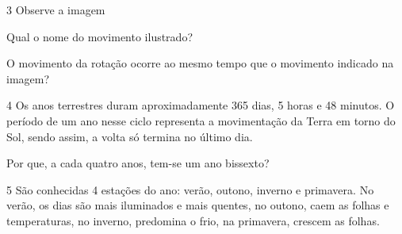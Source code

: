\num{3} Observe a imagem



\begin{escolha}
\item Qual o nome do movimento ilustrado?


\item O movimento da rotação ocorre ao mesmo tempo que o movimento indicado na imagem?

\end{escolha}

\num{4} Os anos terrestres duram aproximadamente 365 dias, 5 horas
e 48 minutos. O período de um ano nesse ciclo representa a movimentação
da Terra em torno do Sol, sendo assim, a volta só termina no último dia.

Por que, a cada quatro anos, tem-se um ano bissexto?


\num{5} São conhecidas 4 estações do ano: verão, outono, inverno e
primavera. No verão, os dias são mais iluminados e mais quentes, no
outono, caem as folhas e temperaturas, no inverno, predomina o frio, na
primavera, crescem as folhas.

